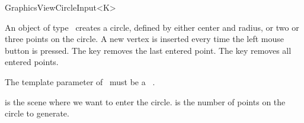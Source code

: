 \begin{ccRefClass}[Qt::]{GraphicsViewCircleInput<K>}

\ccDefinition
An object of type \ccRefName\ creates a circle, defined by either
center and radius, or two or three points on the circle. A new 
vertex is inserted every time the left mouse button is pressed.
The  key removes the last entered point. The  
key removes all entered points.



\ccParameters

The template parameter of \ccRefName\ must be a \cgal\ . 

\ccInheritsFrom
{}

\ccGlue

\ccCreation
{}

{ is the scene where we want to enter the circle.  is the
  number of points on the circle to generate.}


\end{ccRefClass}







